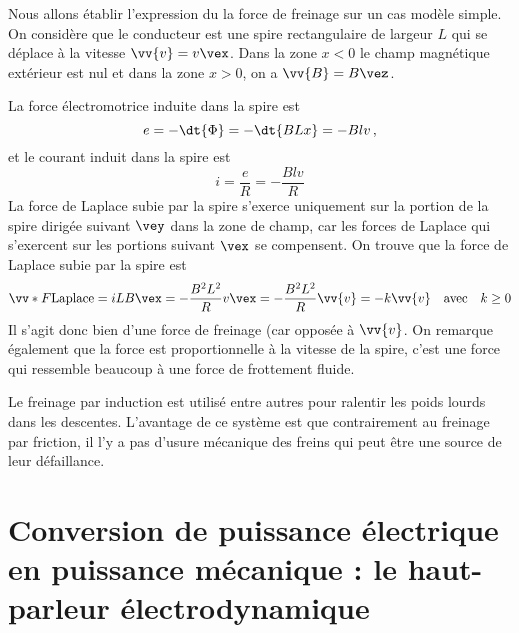 \documentclass{cours}
\begin{document}
Nous allons établir l'expression du la force de freinage sur un cas modèle simple. On considère que le conducteur est une spire rectangulaire de largeur $L$ qui se déplace à la vitesse $\vv{v}=v \vex $. Dans la zone $x<0$ le champ magnétique extérieur est nul et dans la zone $x>0$, on a $\vv{B}=B \vez $.
\begin{center}
\end{center}
La force électromotrice induite dans la spire est 
\begin{equation}
  e = -\dt{\Phi} = -\dt{BLx} = -Blv \, ,
\end{equation} 
et le courant induit dans la spire est
\begin{equation}
  i = \frac{e}{R} = -\frac{Blv}{R} 
\end{equation}
La force de Laplace subie par la spire s'exerce uniquement sur la portion de la spire dirigée suivant $\vey$ dans la zone de champ, car les forces de Laplace qui s'exercent sur les portions suivant $\vex$ se compensent. On trouve que la force de Laplace subie par la spire est
\begin{equation}
  \vv*{F}{\text{Laplace}} = iLB\vex = -\frac{B^2L^2}{R}v \vex = -\frac{B^2L^2}{R}\vv{v} = -k\vv{v} \quad \text{avec} \quad k\geq 0
\end{equation}
Il s'agit donc bien d'une force de freinage (car opposée à $\vv{v}$. On remarque également que la force est proportionnelle à la vitesse de la spire, c'est une force qui ressemble beaucoup à une force de frottement fluide.

Le freinage par induction est utilisé entre autres pour ralentir les poids lourds dans les descentes. L'avantage de ce système est que contrairement au freinage par friction, il l'y a pas d'usure mécanique des freins qui peut être une source de leur défaillance.

\section{Conversion de puissance électrique en puissance mécanique : le haut-parleur électrodynamique}%
\label{sec:conversion_de_puissance_electrique_en_puissance_mecanique_le_haut_parleur_electrodynamique}
\end{document}
